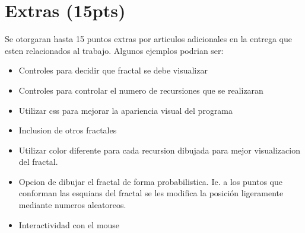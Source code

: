 \documentclass{article}
\begin{document}
\section*{Extras (15pts)}
Se otorgaran hasta 15 puntos extras por articulos adicionales en la entrega que esten relacionados
al trabajo. Algunos ejemplos podrian ser:
\begin{itemize}
        \item{Controles para decidir que fractal se debe visualizar}
        \item{Controles para controlar el numero de recursiones que
        se realizaran}
        \item{Utilizar css para mejorar la apariencia visual del programa}
        \item{Inclusion de otros fractales}
        \item{Utilizar color diferente para cada recursion dibujada para mejor
        visualizacion del fractal.}
        \item{Opcion de dibujar el fractal de forma probabilistica. Ie. a los
        puntos que conforman las esquians del fractal se les modifica la posici\'on
        ligeramente mediante numeros aleatoreos.}
        \item{Interactividad con el mouse}
\end{itemize}
\end{document}
